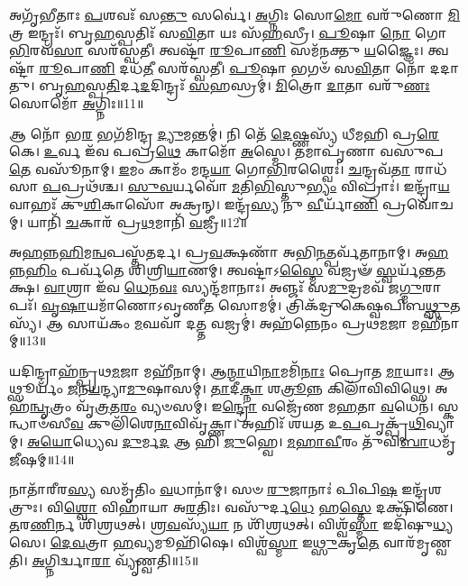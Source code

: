 𑌅𑌗𑍃᳴𑌭𑍀𑌤𑌾𑌃 \ul{𑌪}\-𑌶𑌵𑌃᳴ 𑌸\-\ul{𑌨𑍍𑌤𑍁} 𑌸𑌰𑍍𑌵𑍇॑।
\-\ul{𑌅}\-𑌗𑍍𑌨𑌿𑌃 𑌸𑍋\-\ul{𑌮𑍋} 𑌵𑌰𑍁᳴𑌣𑍋 \ul{𑌮𑌿}\-𑌤𑍍𑌰 𑌇𑌨𑍍𑌦𑍍𑌰𑌃᳴।
𑌬𑍃\-\ul{𑌹}\-𑌸𑍍𑌪𑌤𑌿𑌃᳴ 𑌸\-\ul{𑌵𑌿}\-𑌤𑌾 𑌯𑌃 𑌸᳴\-\ul{𑌹}\-𑌸𑍍𑌰𑍀।
\-\ul{𑌪𑍂}\-𑌷𑌾 \ul{𑌨𑍋} 𑌗𑍋\-\ul{𑌭𑌿}\-𑌰𑌵᳴\-\ul{𑌸𑌾} 𑌸𑌰᳴𑌸𑍍𑌵𑌤𑍀।
𑌤𑍍𑌵𑌷𑍍𑌟𑌾᳴ \ul{𑌰𑍂}\-𑌪𑌾\-\ul{𑌣𑌿} 𑌸𑌮᳴𑌨𑌕𑍍𑌤𑍁 \ul{𑌯}\-𑌜𑍍𑌞𑍈𑌃।
𑌤𑍍𑌵𑌷𑍍𑌟𑌾᳴ \ul{𑌰𑍂}\-𑌪𑌾\-\ul{𑌣𑌿} 𑌦𑌧᳴\-\ul{𑌤𑍀} 𑌸𑌰᳴𑌸𑍍𑌵𑌤𑍀।
\-\ul{𑌪𑍂}\-𑌷𑌾 𑌭𑌗𑍞᳴ 𑌸\-\ul{𑌵𑌿}\-𑌤𑌾 𑌨𑍋᳴ 𑌦𑌦𑌾𑌤𑍁।
𑌬𑍃\-\ul{𑌹}\-𑌸𑍍𑌪\-\ul{𑌤𑌿}\-𑌰𑍍𑌦\-\ul{𑌦}\-𑌦𑌿𑌨𑍍𑌦𑍍𑌰𑌃᳴ \ul{𑌸}\-𑌹𑌸𑍍𑌰𑌮𑍍॑।
\-\ul{𑌮𑌿}\-𑌤𑍍𑌰𑍋 \ul{𑌦𑌾}\-𑌤𑌾 𑌵𑌰𑍁᳴\-\ul{𑌣𑌃} 𑌸𑍋𑌮𑍋᳴ \ul{𑌅}\-𑌗𑍍𑌨𑌿𑌃॥11॥\anuvakamend[\-\ul{𑌕}\-\-\ul{𑌰}\-𑌨𑍍𑌨𑌿𑌵𑌿᳴𑌷𑍍𑌟𑌮𑌸𑍍𑌯\-\ul{𑌤𑌾}\-𑌨𑍍𑌨𑌵᳴ 𑌚]

𑌆 𑌨𑍋᳴ 𑌭\-\ul{𑌰} 𑌭𑌗᳴𑌮𑌿𑌨𑍍𑌦𑍍𑌰 \ul{𑌦𑍍𑌯𑍁}\-𑌮𑌨𑍍𑌤𑌮𑍍॑।
𑌨𑌿 𑌤𑍇᳴ \ul{𑌦𑍇}\-𑌷𑍍𑌣𑌸𑍍𑌯᳴ 𑌧𑍀𑌮𑌹𑌿 𑌪𑍍𑌰\-\ul{𑌰𑍇}\-𑌕𑍇।
\-\ul{𑌉}\-𑌰𑍍𑌵 𑌇᳴𑌵 𑌪𑌪𑍍𑌰\-\ul{𑌥𑍇} 𑌕𑌾𑌮𑍋᳴ \ul{𑌅}\-𑌸𑍍𑌮𑍇।
𑌤𑌮𑌾𑌪𑍃᳴𑌣𑌾 𑌵𑌸𑍁𑌪\-\ul{𑌤𑍇} 𑌵𑌸𑍂᳴𑌨𑌾𑌮𑍍।
\-\ul{𑌇}\-𑌮𑌂 𑌕𑌾𑌮𑌂᳴ 𑌮𑌨𑍍𑌦\-\ul{𑌯𑌾} 𑌗𑍋\-\ul{𑌭𑌿}\-𑌰𑌶𑍍𑌵𑍈𑌃॑।
\-\ul{𑌚}\-𑌨𑍍𑌦𑍍𑌰𑌵᳴\-\ul{𑌤𑌾} 𑌰𑌾𑌧᳴𑌸𑌾 \ul{𑌪}\-𑌪𑍍𑌰𑌥᳴𑌶𑍍𑌚।
\-\ul{𑌸𑍁}\-\-\ul{𑌵}\-𑌰𑍍𑌯𑌵𑍋᳴ \ul{𑌮}\-𑌤𑌿\-\ul{𑌭𑌿}\-𑌸𑍍𑌤𑍁\-\ul{𑌭𑍍𑌯𑌂} 𑌵𑌿𑌪𑍍𑌰𑌾𑌃॑।
𑌇𑌨𑍍𑌦𑍍𑌰𑌾᳴\-\ul{𑌯} 𑌵𑌾𑌹𑌃᳴ 𑌕𑍁\-\ul{𑌶𑌿}\-𑌕𑌾𑌸𑍋᳴ 𑌅𑌕𑍍𑌰𑌨𑍍।
𑌇𑌨𑍍𑌦𑍍𑌰᳴\-\ul{𑌸𑍍𑌯} 𑌨𑍁 \ul{𑌵𑍀}\-𑌰𑍍𑌯𑌾᳴\-\ul{𑌣𑌿} 𑌪𑍍𑌰𑌵𑍋᳴𑌚𑌮𑍍।
𑌯𑌾𑌨𑌿᳴ \ul{𑌚}\-𑌕𑌾𑌰᳴ 𑌪𑍍𑌰\-\ul{𑌥}\-𑌮𑌾𑌨𑌿᳴ \ul{𑌵}\-𑌜𑍍𑌰𑍀॥12॥

𑌅\-\ul{𑌹}\-𑌨𑍍𑌨\-\ul{𑌹𑌿}\-𑌮\-\ul{𑌨𑍍𑌵}\-𑌪𑌸𑍍𑌤᳴𑌤𑌰𑍍𑌦।
𑌪𑍍𑌰\-\ul{𑌵}\-𑌕𑍍𑌷𑌣𑌾᳴ 𑌅𑌭𑌿\-\ul{𑌨}\-𑌤𑍍𑌪𑌰𑍍𑌵᳴𑌤𑌾𑌨𑌾𑌮𑍍।
𑌅\-\ul{𑌹}\-𑌨𑍍𑌨\-\ul{𑌹𑌿𑌂} 𑌪𑌰𑍍𑌵᳴𑌤𑍇 𑌶𑌿𑌶𑍍𑌰𑌿\-\ul{𑌯𑌾}\-𑌣𑌮𑍍।
𑌤𑍍𑌵𑌷𑍍𑌟𑌾॑\-𑌽\-\ul{𑌸𑍍𑌮𑍈} 𑌵𑌜𑍍𑌰𑍟᳴ \ul{𑌸𑍍𑌵}\-𑌰𑍍𑌯᳴𑌨𑍍𑌤𑌤𑌕𑍍𑌷।
\-\ul{𑌵𑌾}\-𑌶𑍍𑌰𑌾 𑌇᳴𑌵 \ul{𑌧𑍇}\-𑌨\-\ul{𑌵𑌃} 𑌸𑍍𑌯𑌨𑍍𑌦᳴𑌮𑌾𑌨𑌾𑌃।
𑌅𑌞𑍍𑌜𑌃᳴ 𑌸\-\ul{𑌮𑍁}\-𑌦𑍍𑌰𑌮𑌵᳴ 𑌜\-\ul{𑌗𑍍𑌮𑍁}\-𑌰𑌾𑌪𑌃᳴।
\-\ul{𑌵𑍃}\-\-\ul{𑌷𑌾}\-𑌯𑌮𑌾᳴𑌣𑍋\-𑌽𑌵𑍃𑌣𑍀\-\ul{𑌤} 𑌸𑍋𑌮𑌮𑍍॑।
𑌤𑍍𑌰𑌿𑌕᳴𑌦𑍍𑌰𑍁𑌕𑍇𑌷𑍍𑌵𑌪𑌿𑌬\-\ul{𑌥𑍍𑌸𑍁}\-𑌤𑌸𑍍𑌯᳴।
𑌆 𑌸𑌾𑌯᳴𑌕𑌂 \ul{𑌮}\-𑌘𑌵𑌾᳴ 𑌦\-\ul{𑌤𑍍𑌤} 𑌵𑌜𑍍𑌰𑌮𑍍॑।
𑌅𑌹᳴𑌨𑍍𑌨𑍇𑌨𑌂 𑌪𑍍𑌰𑌥\-\ul{𑌮}\-𑌜𑌾 𑌮𑌹𑍀᳴𑌨𑌾𑌮𑍍॥13॥

𑌯𑌦𑌿𑌨𑍍𑌦𑍍𑌰𑌾𑌹᳴𑌨𑍍𑌪𑍍𑌰𑌥\-\ul{𑌮}\-𑌜𑌾 𑌮𑌹𑍀᳴𑌨𑌾𑌮𑍍।
𑌆\-\ul{𑌨𑍍𑌮𑌾}\-𑌯𑌿\-\ul{𑌨𑌾}\-𑌮𑌮𑌿᳴\-\ul{𑌨𑌾𑌃} 𑌪𑍍𑌰𑍋𑌤 \ul{𑌮𑌾}\-𑌯𑌾𑌃।
𑌆𑌥𑍍𑌸𑍂𑌰𑍍𑌯𑌂᳴ \ul{𑌜}\-𑌨\-\ul{𑌯}\-𑌨𑍍𑌦𑍍𑌯𑌾\-\ul{𑌮𑍁}\-𑌷𑌾𑌸𑌮𑍍॑।
\-\ul{𑌤𑌾}\-𑌦𑍀\-\ul{𑌕𑍍𑌨𑌾} 𑌶\-\ul{𑌤𑍍𑌰𑍂}\-𑌨𑍍𑌨 𑌕𑌿𑌲𑌾᳴𑌵𑌿𑌵𑌿𑌥𑍍𑌸𑍇।
𑌅𑌹᳴\-\ul{𑌨𑍍𑌵𑍃}\-𑌤𑍍𑌰𑌂 𑌵𑍃᳴\-\ul{𑌤𑍍𑌰}\-𑌤\-\ul{𑌰𑌂} 𑌵𑍍𑌯𑍞𑌸𑌮𑍍॑।
𑌇\-\ul{𑌨𑍍𑌦𑍍𑌰𑍋} 𑌵𑌜𑍍𑌰𑍇᳴𑌣 𑌮\-\ul{𑌹}\-𑌤𑌾 \ul{𑌵}\-𑌧𑍇𑌨᳴।
𑌸𑍍𑌕𑌨𑍍𑌧𑌾𑍞᳴𑌸𑍀\-\ul{𑌵} 𑌕𑍁𑌲𑌿᳴𑌶𑍇\-\ul{𑌨𑌾}\-𑌵𑌿𑌵𑍃᳴𑌕𑍍𑌣𑌾।
𑌅𑌹𑌿𑌃᳴ 𑌶𑌯𑌤 𑌉\-\ul{𑌪}\-𑌪𑍃𑌕𑍍𑌪𑍃᳴\-\ul{𑌥𑌿}\-𑌵𑍍𑌯𑌾𑌮𑍍।
\-\ul{𑌅}\-\-\ul{𑌯𑍋}\-𑌧𑍍𑌯𑍇𑌵 \ul{𑌦𑍁}\-𑌰𑍍𑌮\-\ul{𑌦} 𑌆 𑌹𑌿 \ul{𑌜𑍁}\-𑌹𑍍𑌵𑍇।
\-\ul{𑌮}\-\-\ul{𑌹𑌾}\-\-\ul{𑌵𑍀}\-𑌰𑌂 𑌤𑍁᳴𑌵𑌿\-\ul{𑌬𑌾}\-𑌧𑌮𑍃᳴\-\ul{𑌜𑍀}\-𑌷𑌮𑍍॥14॥

𑌨𑌾𑌤𑌾᳴𑌰𑍀𑌰\-\ul{𑌸𑍍𑌯} 𑌸𑌮𑍃᳴𑌤𑌿𑌂 \ul{𑌵}\-𑌧𑌾𑌨𑌾॑𑌮𑍍।
𑌸𑍞 \ul{𑌰𑍁}\-𑌜𑌾𑌨𑌾𑌃॑ 𑌪𑌿𑌪𑌿\-\ul{𑌷} 𑌇𑌨𑍍𑌦𑍍𑌰᳴𑌶𑌤𑍍𑌰𑍁𑌃।
𑌵𑌿\-\ul{𑌶𑍍𑌵𑍋} 𑌵𑌿𑌹𑌾᳴𑌯𑌾 𑌅\-\ul{𑌰}\-𑌤𑌿𑌃।
𑌵𑌸𑍁᳴𑌰𑍍𑌦\-\ul{𑌧𑍇} 𑌹\-\ul{𑌸𑍍𑌤𑍇} 𑌦𑌕𑍍𑌷𑌿᳴𑌣𑍇।
\-\ul{𑌤}\-𑌰\-\ul{𑌣𑌿}\-𑌰𑍍𑌨 𑌶𑌿᳴𑌶𑍍𑌰𑌥𑌤𑍍।
\-\ul{𑌶𑍍𑌰}\-\-\ul{𑌵}\-𑌸𑍍𑌯᳴\-\ul{𑌯𑌾} 𑌨 𑌶𑌿᳴𑌶𑍍𑌰𑌥𑌤𑍍।
𑌵𑌿𑌶𑍍𑌵᳴\-\ul{𑌸𑍍𑌮𑌾} 𑌇𑌦𑌿᳴𑌷𑍁\-\ul{𑌧𑍍𑌯}\-𑌸𑍇।
\-\ul{𑌦𑍇}\-\-\ul{𑌵}\-𑌤𑍍𑌰𑌾 \ul{𑌹}\-𑌵𑍍𑌯𑌮𑍂𑌹𑌿᳴𑌷𑍇।
𑌵𑌿𑌶𑍍𑌵᳴\-\ul{𑌸𑍍𑌮𑌾} 𑌇\-\ul{𑌥𑍍𑌸𑍁}\-𑌕𑍃\-\ul{𑌤𑍇} 𑌵𑌾𑌰᳴𑌮𑍃𑌣𑍍𑌵𑌤𑌿।
\-\ul{𑌅}\-𑌗𑍍𑌨𑌿𑌰𑍍𑌦𑍍𑌵𑌾\-\ul{𑌰𑌾} 𑌵𑍍𑌯𑍃᳴𑌣𑍍𑌵𑌤𑌿॥15॥

